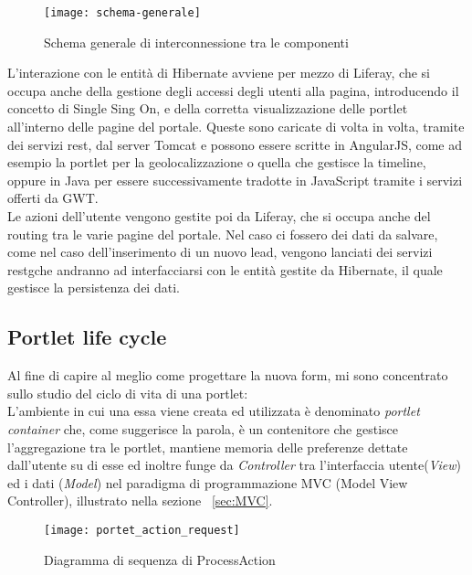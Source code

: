 \newpage

\begin{figure}[h]
	\centering
	\texttt{[image: schema-generale]}
	\caption{Schema generale di interconnessione tra le componenti}
	\label{schema-generale}
\end{figure}
L'interazione con le entità di Hibernate avviene per mezzo di Liferay, che si occupa anche della gestione degli accessi degli utenti alla pagina, introducendo il concetto di Single Sing On, e della corretta visualizzazione delle \gls{portlet} all'interno delle pagine del portale. Queste sono caricate di volta in volta, tramite dei servizi \gls{rest}\glsfirstoccur, dal server Tomcat e possono essere scritte in AngularJS, come ad esempio la \gls{portlet} per la geolocalizzazione o quella che gestisce la timeline, oppure in Java per essere successivamente tradotte in JavaScript tramite i servizi offerti da GWT.\\
Le azioni dell'utente vengono gestite poi da Liferay, che si occupa anche del routing tra le varie pagine del portale. Nel caso ci fossero dei dati da salvare, come nel caso dell'inserimento di un nuovo lead, vengono lanciati dei servizi \gls{restg}che andranno ad interfacciarsi con le entità gestite da Hibernate, il quale gestisce la persistenza dei dati.\\

\subsection{Portlet life cycle}
Al fine di capire al meglio come progettare la nuova form, mi sono concentrato sullo studio del ciclo di vita di una \gls{portlet}:\\
L'ambiente in cui una essa viene creata ed utilizzata è denominato \emph{portlet container} che, come suggerisce la parola, è un contenitore che gestisce l'aggregazione tra le \gls{portlet}, mantiene memoria delle preferenze dettate dall'utente su di esse ed inoltre funge da \emph{Controller} tra l'interfaccia utente(\emph{View}) ed i dati (\emph{Model}) nel paradigma di programmazione MVC (Model View Controller), illustrato nella sezione ~\ref{sec:MVC}.\\
\newpage
\begin{figure}[h]
	\centering
	\texttt{[image: portet\_action\_request]}
	\caption{Diagramma di sequenza di ProcessAction}
	\label{process-action}
\end{figure}

